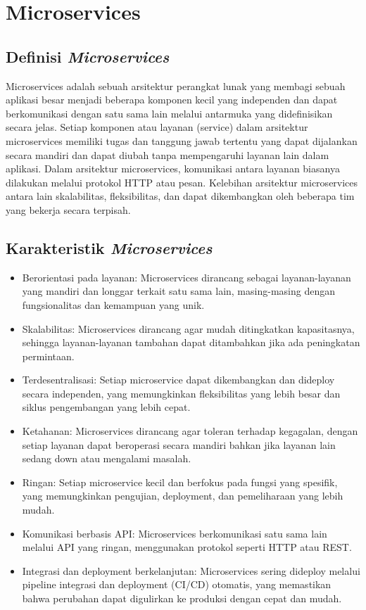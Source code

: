 
	\setcounter{chapter}{11}
	\chapter{Microservices}
	
	
	\section{Definisi \textit{Microservices}}
	
	Microservices adalah sebuah arsitektur perangkat lunak yang membagi sebuah aplikasi besar menjadi beberapa komponen kecil yang independen dan dapat berkomunikasi dengan satu sama lain melalui antarmuka yang didefinisikan secara jelas. Setiap komponen atau layanan (service) dalam arsitektur microservices memiliki tugas dan tanggung jawab tertentu yang dapat dijalankan secara mandiri dan dapat diubah tanpa mempengaruhi layanan lain dalam aplikasi. Dalam arsitektur microservices, komunikasi antara layanan biasanya dilakukan melalui protokol HTTP atau pesan. Kelebihan arsitektur microservices antara lain skalabilitas, fleksibilitas, dan dapat dikembangkan oleh beberapa tim yang bekerja secara terpisah.
	
	
	\section{Karakteristik \textit{Microservices}}
	 \begin{itemize}
	 \item Berorientasi pada layanan: Microservices dirancang sebagai layanan-layanan yang mandiri dan longgar terkait satu sama lain, masing-masing dengan fungsionalitas dan kemampuan yang unik.
	 \item Skalabilitas: Microservices dirancang agar mudah ditingkatkan kapasitasnya, sehingga layanan-layanan tambahan dapat ditambahkan jika ada peningkatan permintaan.
	 \item Terdesentralisasi: Setiap microservice dapat dikembangkan dan dideploy secara independen, yang memungkinkan fleksibilitas yang lebih besar dan siklus pengembangan yang lebih cepat.
	 \item Ketahanan: Microservices dirancang agar toleran terhadap kegagalan, dengan setiap layanan dapat beroperasi secara mandiri bahkan jika layanan lain sedang down atau mengalami masalah.
	 \item Ringan: Setiap microservice kecil dan berfokus pada fungsi yang spesifik, yang memungkinkan pengujian, deployment, dan pemeliharaan yang lebih mudah.
	 \item Komunikasi berbasis API: Microservices berkomunikasi satu sama lain melalui API yang ringan, menggunakan protokol seperti HTTP atau REST.
	 \item Integrasi dan deployment berkelanjutan: Microservices sering dideploy melalui pipeline integrasi dan deployment (CI/CD) otomatis, yang memastikan bahwa perubahan dapat digulirkan ke produksi dengan cepat dan mudah.
	 \end{itemize}
	

